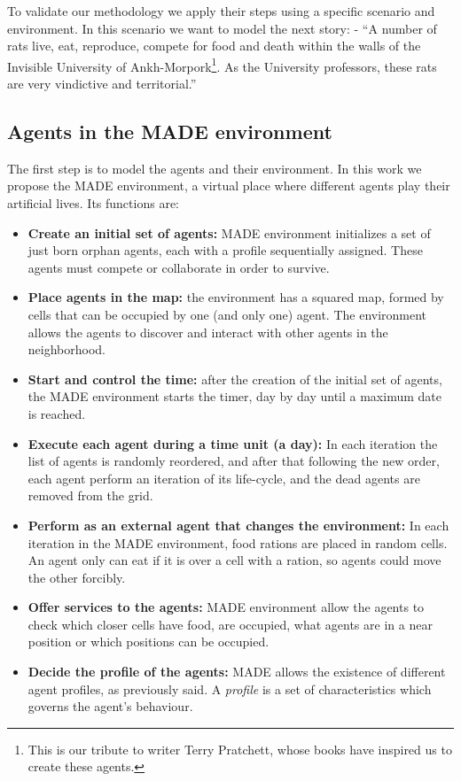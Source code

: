 \documentclass{sig-alternate}
\begin{document}
To validate our methodology we apply their steps using a specific scenario and environment. In this scenario we want to model the next story: %
 - ``A number of rats live, eat, reproduce, compete for food and death within the walls of the Invisible University of Ankh-Morpork\footnote{This is our tribute to writer Terry Pratchett, whose books have inspired us to create these agents.}. As the University professors, these rats are very vindictive and territorial.''

\subsection{Agents in the MADE environment}

The first step is to model the agents and their environment. In this work we propose the MADE environment, a virtual place where different agents play their artificial lives. Its functions are:

\begin{itemize}
\item \textbf{Create an initial set of agents:} MADE environment
  initializes a set of just born orphan agents, each with a profile
  sequentially assigned.
 These agents must compete or collaborate in order to survive.
\item \textbf{Place agents in the map:} the environment has a squared map, formed by cells that can be occupied by one (and only one) agent. The environment allows the agents to discover and interact with other agents in the neighborhood.
\item \textbf{Start and control the time:} after the creation of the initial set of agents, the MADE environment starts the timer, day by day until a maximum date is reached.
\item \textbf{Execute each agent during a time unit (a day):} In each iteration the list of agents is randomly reordered, and after that following the new order, each agent perform an iteration of its life-cycle, and the dead agents are removed from the grid.
\item \textbf{Perform as an external agent that changes the environment:} In each iteration in the MADE environment, food rations are placed in random cells. An agent only can eat if it is over a cell with a ration, so agents could move the other forcibly.
\item \textbf{Offer services to the agents:} MADE environment allow the agents to check which closer cells have food, are occupied, what agents are in a near position or which positions can be occupied.
\item \textbf{Decide the profile of the agents:} MADE allows the existence of different agent profiles, as previously said. A {\em profile} is a set of characteristics which governs the agent's behaviour.
\end{itemize}
\end{document}
